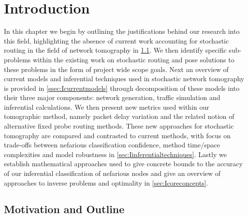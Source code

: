 \chapter{Introduction}
\label{cha:intro}

In this chapter we begin by outlining the justifications behind our research into this field, highlighting the absence of current work accounting for stochastic routing in the field of network tomography in \cref{sec:Imotivationandoutline}. We then identify specific sub-problems within the existing work on stochastic routing and pose solutions to these problems in the form of project wide scope goals. Next an overview of current models and inferential techniques used in stochastic network tomography is provided in \cref{ssec:Icurrentmodels} through decomposition of these models into their three major components: network generation, traffic simulation and inferential calculations. We then present new metrics used within our tomographic method, namely packet delay variation and the related notion of alternative fixed probe routing methods. These new approaches for stochastic tomography are compared and contrasted to current methods, with focus on trade-offs between nefarious classification confidence, method time/space complexities and model robustness in \cref{sec:Iinferentialtechniques}. Lastly we establish mathematical approaches used to give concrete bounds to the accuracy of our inferential classification of nefarious nodes and give an overview of approaches to inverse problems and optimality in \cref{sec:Icoreconcepts}.\par

\newpage
\section{Motivation and Outline}
\label{sec:Imotivationandoutline}

